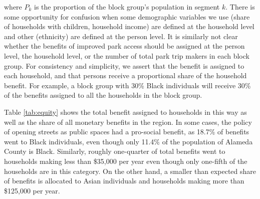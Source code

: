 \documentclass[3p, authoryear, review]{elsarticle} %
\begin{document}
where \(P_k\) is the proportion of the block group's population in segment \(k\). There is some opportunity for confusion when some demographic variables we use (share of households with children, household income) are defined at the household level and other (ethnicity) are defined at the person level. It is similarly not clear whether the benefits of improved park access should be assigned at the person level, the household level, or the number of total park trip makers in each block group. For consistency and simplicity, we assert that the benefit is assigned to each household, and that persons receive a proportional share of the household benefit. For example, a block group with 30\% Black individuals will receive 30\% of the benefits assigned to all the households in the block group.

Table \ref{tab:equity} shows the total benefit assigned to households in this way as well as the share of all monetary benefits in the region. In some cases, the policy of opening streets as public spaces had a pro-social benefit, as 18.7\% of benefits went to Black individuals, even though only 11.4\% of the population of Alameda County is Black. Similarly, roughly one-quarter of total benefits went to households making less than \$35,000 per year even though only one-fifth of the households are in this category. On the other hand, a smaller than expected share of benefits is allocated to Asian individuals and households making more than \$125,000 per year.
\end{document}
